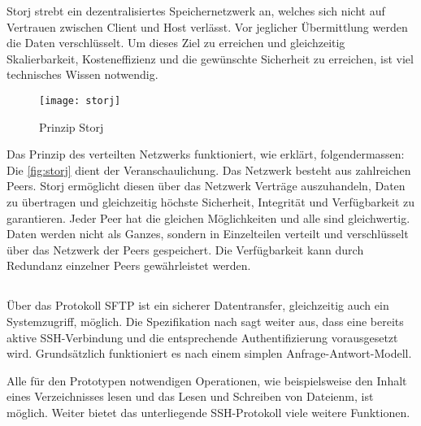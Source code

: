 Storj strebt ein dezentralisiertes Speichernetzwerk an, welches sich nicht auf Vertrauen zwischen Client und Host verlässt. Vor jeglicher Übermittlung werden die Daten verschlüsselt. Um dieses Ziel zu erreichen und gleichzeitig Skalierbarkeit, Kosteneffizienz und die ge\-wün\-schte Sicherheit zu erreichen, ist viel technisches Wissen notwendig. 


    \begin{figure}[H]
    \centering
    \texttt{[image: storj]}
    \caption[Prinzip Storj aus \cite{wilkinson2014storj}]{Prinzip Storj}
    \label{fig:storj}
    \end{figure}
 


Das Prinzip des verteilten Netzwerks funktioniert, wie \cite[S.~2-16]{wilkinson2014storj} erklärt, folgendermassen: Die \autoref{fig:storj} dient der Veranschaulichung. Das Netzwerk besteht aus zahlreichen Peers. Storj ermöglicht diesen über das Netzwerk Verträge auszuhandeln, Daten zu übertragen und gleichzeitig höchste Sicherheit, Integrität und Verfügbarkeit zu garantieren. Jeder Peer hat die gleichen Möglichkeiten und alle sind gleichwertig. Daten werden nicht als Ganzes, sondern in Einzelteilen verteilt und verschlüsselt über das Netzwerk der Peers gespeichert. Die Verfügbarkeit kann durch Redundanz einzelner Peers ge\-währ\-leist\-et werden.



\subsection{}

Über das Protokoll SFTP ist ein sicherer Datentransfer, gleichzeitig auch ein Systemzugriff, möglich. Die Spezifikation nach \cite[S.~3]{galbraith2006ssh} sagt weiter aus, dass eine bereits aktive SSH-Verbindung und die entsprechende Authentifizierung vorausgesetzt wird. Grundsätzlich funktioniert es nach einem simplen Anfrage-Antwort-Modell.

Alle für den Prototypen notwendigen Operationen, wie beispielsweise den Inhalt eines Verzeichnisses lesen und das Lesen und Schreiben von Dateienm, ist möglich. Weiter bietet das unterliegende SSH-Protokoll viele weitere Funktionen.


